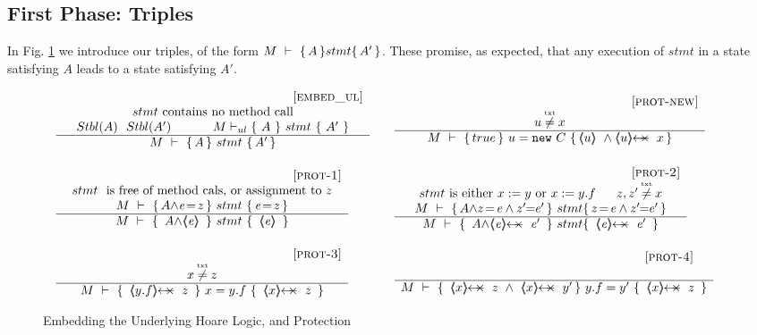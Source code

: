 \subsection{First Phase: Triples}
\label{s:hoare:first}

In  Fig. \ref{f:underly}  we introduce our triples, of the form ${   M\ \vdash\ \{\,A\, \} stmt \{\,A'\, \}}$. 
These promise, as expected, that any execution of $stmt$ in a state   satisfying $A$ leads to a state satisfying $A'$.

{\small{
\begin{figure}[tht]
$
\begin{array}{c}
\begin{array}{lcl}
\inferruleSD{\hspace{0.5cm} [\sc{embed\_ul}]}
	{stmt  \ \mbox{contains no method call}   
        \\
        \Stable{A}  \ \  \Stable{A'}  \ \ \ \ \ \ \ \ \ \ { M \vdash_{ul} \{ \ A\ \} {\ stmt\ }\{\ A'\ \}}
	 	 }
	{\hproves{M}  {A} {\ stmt\ }{A'} } 
& &
\inferruleSD{\hspace{0.5cm} [\sc{prot-new}]}
	{
	\sdN{u \txtneq   x	 }
	}
	{	 
 	\hproves{M} 
 						{ \sdN{true} }  
 					{\  u = \prg{new}\ C \ }
 						  {  \inside{u}\  \wedge  \protectedFrom{u}{x}} 
 	} 
\\ \\
	{\inferruleSD{\hspace{0.5cm} [\sc{prot-1}]}
	{   stmt \ \mbox{ is free of  method cals, or assignment to $z$}
	\\
	{\hproves{M}  {{A \wedge} \re\!=\!z} {\ stmt\ }{ \re\!=\!z} }
	}
	{\hproves{M} 
						{\  {A \wedge} \inside{\re}  \ }
						{\  stmt \ }
						{\  \inside{\re}\ }
	}
}
& &
      {\inferruleSD{\hspace{0.5cm} [\sc{prot-2}]}
	{ stmt \mbox{ is either $x:=y$ or $x:=y.f$}\ \ \ \ \    z,z' \txtneq x 
		\\
	{\hproves{M} 
						{  {A \wedge} z\!=\!\re \wedge z'\!\!=\!\! \re' }
						{\ stmt }
						{   z\!=\! \re \wedge z'\!\!=\!\! \re' }
	}
	}
	{
	\hproves{M} 
						{\ {A \wedge} \protectedFrom{\re}{\re'}\ }
						{\ stmt }
						{\ \protectedFrom{\re}{\re'}\ }
	}
}
\\ \\
      {\inferruleSD{\hspace{0.5cm} [\sc{prot-3}]}
	{\sdN{x \txtneq   z	 } }
	{\hproves{M} 
						{\ \protectedFrom{y.f}{z}\ }
						{\ x =y.f\ }
						{\ \protectedFrom{x}{z}\ }
	}
}
& &
        {\inferruleSD{\hspace{0.5cm} [\sc{prot-4}]}
	{ }
	{\hproves{M} 
						{\ \protectedFrom{x}{z} \ \wedge \   \protectedFrom{x}{y'} }
						{\ y.f=y'\ }
						{\ \protectedFrom{x}{z} \ }
	}
}
\end{array}
\end{array}
 $
\caption{Embedding the Underlying Hoare Logic, and Protection}
\label{f:protection}
\label{f:underly}
\end{figure}
}}


